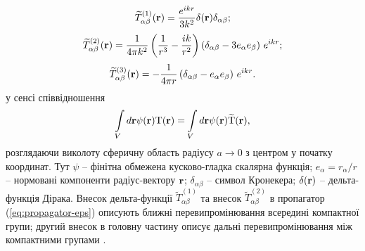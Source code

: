 \documentclass[14pt,twoside]{vakthesis}
\begin{document}
\begin{equation}\label{eq:propagator-eps-T1}
{\widetilde T}_{\alpha\beta}^{(1)} ({\rm {\bf r}}) = \frac{e^{ikr}}{3k^{2}} \delta({\bf r})\delta_{\alpha\beta};
\end{equation}
\begin{equation}\label{eq:propagator-eps-T2}
{\widetilde T}_{\alpha\beta}^{(2)} ({\rm {\bf r}}) = \frac{1}{4\pi k^{2}}
\left(\frac{1}{r^3}-\frac{ik}{r^2}\right)
\left( \delta _{\alpha\beta} - 3e_{\alpha} e_{\beta}
\right)\,e^{ikr};
\end{equation}
\begin{equation}\label{eq:propagator-eps-T3}
{\widetilde T}_{\alpha\beta}^{(3)} ({\rm {\bf r}}) = - \frac{1}{4\pi r}\left( {\delta
	_{\alpha\beta} - e_{\alpha} e_{\beta}} \right)\,e^{ikr}.
\end{equation}
у сенсі співвідношення
$$
\int\limits_V d{\bf r} \psi({\bf r}) {\rm T}({\bf r}) =
\int\limits_V d{\bf r} \psi({\bf r}) \widetilde{\rm T}({\bf r}),
$$
розглядаючи виколоту сферичну область радіусу $a\to 0$ з центром у початку координат. Тут $\psi$ -- фінітна обмежена кусково-гладка скалярна функція; $e_\alpha = r_\alpha/r$ -- нормовані компоненти радіус-вектору ${\bf r}$; $\delta_{\alpha\beta}$ -- символ Кронекера; $\delta({\bf r})$ -- дельта-функція Дірака.
Внесок дельта-функції ${\widetilde T}_{\alpha\beta}^{(1)}$ та внесок ${\widetilde T}_{\alpha\beta}^{(2)}$ в пропагатор (\ref{eq:propagator-eps})  описують ближні перевипромінювання всередині компактної групи; другий внесок в головну частину описує дальні перевипромінювання між компактними групами \cite{Sushko2007, Sushko2017}.
\end{document}
